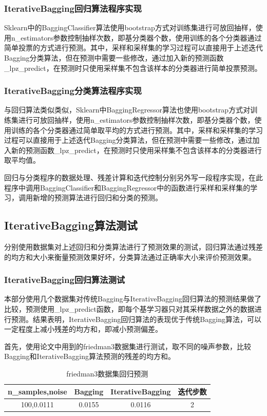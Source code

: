 \documentclass[a4paper,oneside,12pt]{article}
\begin{document}
\begin{spacing}{1.5}
\subsubsection{IterativeBagging回归算法程序实现}
Sklearn中的BaggingClassifier算法使用bootstrap方式对训练集进行可放回抽样，使用n\_estimators参数控制抽样次数，即基分类器个数，使用训练的各个分类器通过简单投票的方式进行预测。其中，采样和采样集的学习过程可以直接用于上述迭代Bagging分类算法，但在预测中需要一些修改，通过加入新的预测函数\_lpz\_predict，在预测时只使用采样集不包含该样本的分类器进行简单投票预测。\par
\subsubsection{IterativeBagging分类算法程序实现}
与回归算法类似类似，Sklearn中BaggingRegressor算法也使用bootstrap方式对训练集进行可放回抽样，使用n\_estimators参数控制抽样次数，即基分类器个数，使用训练的各个分类器通过简单取平均的方式进行预测。其中，采样和采样集的学习过程可以直接用于上述迭代Bagging分类算法，但在预测中需要一些修改，通过加入新的预测函数\_lpz\_predict，在预测时只使用采样集不包含该样本的分类器进行取平均值。\par
回归与分类程序的数据处理、残差计算和迭代控制分别另外写一段程序实现，在此程序中调用BaggingClassifier和BaggingRegressor中的函数进行采样和采样集的学习，调用新增的预测算法进行回归和分类的预测。\par
\newpage
\subsection{IterativeBagging算法测试}
分别使用数据集对上述回归和分类算法进行了预测效果的测试，回归算法通过残差的均方和大小来衡量预测效果好坏，分类算法通过正确率大小来评价预测效果。\par
\subsubsection{IterativeBagging回归算法测试}
本部分使用几个数据集对传统Bagging与IterativeBagging回归算法的预测结果做了比较，预测使用\_lpz\_predict函数，即每个基学习器只对其采样数据之外的数据进行预测。结果表明，IterativeBagging回归算法的表现优于传统Bagging算法，可以一定程度上减小残差的均方和，即减小预测偏差。\par
首先，使用论文中用到的friedman3数据集进行测试，取不同的噪声参数，比较Bagging和IterativeBagging算法预测的残差的均方和。\par
\begin{table}[htbp]
\caption{friedman3数据集回归预测\label{tab1}}
\center
\begin{tabular}{cccc}
\toprule
n\_samples,noise &Bagging &IterativeBagging &迭代步数\\
\midrule
100,0.0111 &0.0155 &0.0116 &2\\


\end{tabular}
\end{table}
\end{spacing}
\end{document}
